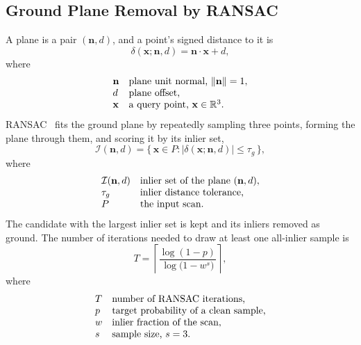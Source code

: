 \subsection{Ground Plane Removal by RANSAC}
\label{sec:th-ransac}
A plane is a pair $(\mathbf{n}, d)$, and a point's signed distance to it is
\begin{equation}
  \delta(\mathbf{x};\mathbf{n},d) = \mathbf{n}\cdot\mathbf{x} + d ,
  \label{eq:signed-distance}
\end{equation}
where
\[
  \begin{array}{@{}l@{\quad}l@{}}
    \mathbf{n} & \text{plane unit normal, } \lVert\mathbf{n}\rVert = 1,\\
    d & \text{plane offset,}\\
    \mathbf{x} & \text{a query point, } \mathbf{x}\in\mathbb{R}^3.
  \end{array}
\]
RANSAC~\cite{fischler1981random} fits the ground plane by repeatedly sampling three points,
forming the plane through them, and scoring it by its inlier set,
\begin{equation}
  \mathcal{I}(\mathbf{n},d) = \bigl\{\, \mathbf{x}\in P : \lvert \delta(\mathbf{x};\mathbf{n},d)\rvert \le \tau_g \,\bigr\},
  \label{eq:ransac-inliers}
\end{equation}
where
\[
  \begin{array}{@{}l@{\quad}l@{}}
    \mathcal{I}(\mathbf{n},d) & \text{inlier set of the plane } (\mathbf{n},d),\\
    \tau_g & \text{inlier distance tolerance,}\\
    P & \text{the input scan.}
  \end{array}
\]
The candidate with the largest inlier set is kept and its inliers removed as ground. The
number of iterations needed to draw at least one all-inlier sample is
\begin{equation}
  T = \left\lceil \frac{\log(1-p)}{\log\!\bigl(1 - w^{s}\bigr)} \right\rceil ,
  \label{eq:ransac-iterations}
\end{equation}
where
\[
  \begin{array}{@{}l@{\quad}l@{}}
    T & \text{number of RANSAC iterations,}\\
    p & \text{target probability of a clean sample,}\\
    w & \text{inlier fraction of the scan,}\\
    s & \text{sample size, } s=3.
  \end{array}
\]

